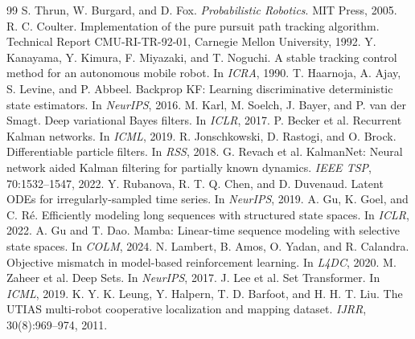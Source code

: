 \documentclass{article}
\begin{document}
\clearpage
\begin{thebibliography}{99}
\small
{}
S. Thrun, W. Burgard, and D. Fox. \emph{Probabilistic Robotics}. MIT Press, 2005.
R. C. Coulter. Implementation of the pure pursuit path tracking algorithm. Technical Report CMU-RI-TR-92-01, Carnegie Mellon University, 1992.
Y. Kanayama, Y. Kimura, F. Miyazaki, and T. Noguchi. A stable tracking control method for an autonomous mobile robot. In \emph{ICRA}, 1990.
T. Haarnoja, A. Ajay, S. Levine, and P. Abbeel. Backprop KF: Learning discriminative deterministic state estimators. In \emph{NeurIPS}, 2016.
M. Karl, M. Soelch, J. Bayer, and P. van der Smagt. Deep variational Bayes filters. In \emph{ICLR}, 2017.
P. Becker et al. Recurrent Kalman networks. In \emph{ICML}, 2019.
R. Jonschkowski, D. Rastogi, and O. Brock. Differentiable particle filters. In \emph{RSS}, 2018.
G. Revach et al. KalmanNet: Neural network aided Kalman filtering for partially known dynamics. \emph{IEEE TSP}, 70:1532--1547, 2022.
Y. Rubanova, R. T. Q. Chen, and D. Duvenaud. Latent ODEs for irregularly-sampled time series. In \emph{NeurIPS}, 2019.
A. Gu, K. Goel, and C. R\'e. Efficiently modeling long sequences with structured state spaces. In \emph{ICLR}, 2022.
A. Gu and T. Dao. Mamba: Linear-time sequence modeling with selective state spaces. In \emph{COLM}, 2024.
N. Lambert, B. Amos, O. Yadan, and R. Calandra. Objective mismatch in model-based reinforcement learning. In \emph{L4DC}, 2020.
M. Zaheer et al. Deep Sets. In \emph{NeurIPS}, 2017.
J. Lee et al. Set Transformer. In \emph{ICML}, 2019.
K. Y. K. Leung, Y. Halpern, T. D. Barfoot, and H. H. T. Liu. The UTIAS multi-robot cooperative localization and mapping dataset. \emph{IJRR}, 30(8):969--974, 2011.
\end{thebibliography}
\end{document}
